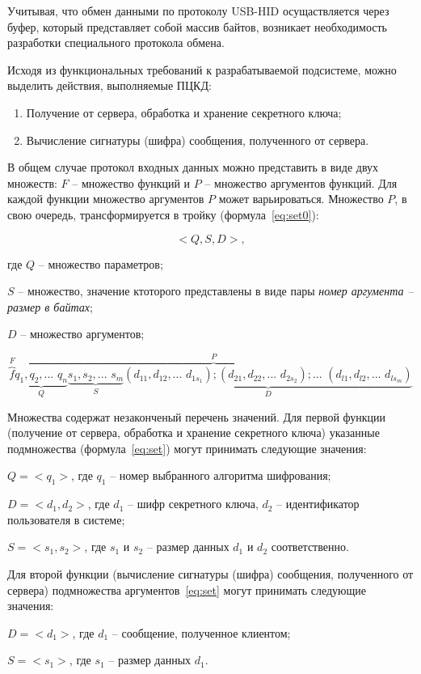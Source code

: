 Учитывая, что обмен данными по протоколу USB-HID осущаствляется через буфер,
который представляет собой массив байтов, возникает необходимость разработки
специального протокола обмена.

Исходя из функциональных требований к разрабатываемой подсистеме, можно выделить
действия, выполняемые ПЦКД:
\begin{enumerate}
  \item Получение от сервера, обработка и хранение секретного ключа;
  \item Вычисление сигнатуры (шифра) сообщения, полученного от сервера.
\end{enumerate}

В общем случае протокол входных данных можно представить в виде двух множеств:
$F$ -- множество функций и $P$ -- множество аргументов функций. Для каждой функции множество
аргументов $P$ может варьироваться. Множество $P$, в свою очередь,
трансформируется в тройку (формула~\ref{eq:set0}):

\begin{equation}
\label{eq:set}
<Q, S, D> ,
\end{equation}

где $Q$ -- множество параметров;

$S$ -- множество, значение ктоторого представлены в виде пары \textit{номер
аргумента -- размер в байтах};

$D$ -- множество аргументов;

\begin{equation}
\label{eq:set0}
\overbrace{f}^F \overbrace{\underbrace{q_1,q_2, \mbox{... } q_n}_Q
\underbrace{s_1,s_2, \mbox{... } s_m}_S \underbrace{(d_{1 1},d_{1 2}, \mbox{... }
d_{1 s_1});(d_{2 1},d_{2 2}, \mbox{... } d_{2 s_2}); \mbox{... } (d_{l 1},d_{l
2}, \mbox{... } d_{l s_m})}_D }^P
\end{equation}

Множества содержат незаконченый перечень значений.
Для первой функции (получение от сервера, обработка и хранение секретного
ключа) указанные подмножества (формула~\ref{eq:set}) могут принимать следующие
значения:

$Q = <q_1>$, где $q_1$ -- номер выбранного алгоритма шифрования;   

$D = <d_1, d_2>$, где $d_1$ -- шифр секретного ключа, $d_2$ -- идентификатор
пользователя в системе;

$S = <s_1, s_2>$, где $s_1$ и $s_2$ -- размер данных $d_1$ и $d_2$
соответственно.


Для второй функции (вычисление сигнатуры (шифра) сообщения, полученного от
сервера) подмножества аргументов~\ref{eq:set} могут принимать следующие
значения:

$D = <d_1>$, где $d_1$ -- сообщение, полученное клиентом;

$S = <s_1>$, где $s_1$ -- размер данных $d_1$.